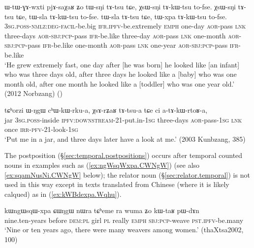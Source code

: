 \begin{exe}
\ex \label{ex:tWsNi.tAtsu}
\gll ɯ-tɯ-ɣɤ-wxti pjɤ-saχaʁ ʑo tɯ-sŋi tɤ-tsu tɕe, χsɯ-sŋi tɤ-kɯ-tsu to-fse. χsɯ-sŋi tɤ-tsu tɕe, tɯ-sla tɤ-kɯ-tsu to-fse. tɯ-sla tɤ-tsu tɕe, tɯ-xpa tɤ-kɯ-tsu to-fse. \\
\textsc{3sg}.\textsc{poss}-\textsc{nmlz}:\textsc{deg}-\textsc{facil}-be.big \textsc{ifr}.\textsc{ipfv}-be.extremely \textsc{emph} one-day \textsc{aor}-pass \textsc{lnk} three-days \textsc{aor}-\textsc{sbj}:\textsc{pcp}-pass \textsc{ifr}-be.like three-day \textsc{aor}-pass \textsc{lnk} one-month \textsc{aor}-\textsc{sbj}:\textsc{pcp}-pass \textsc{ifr}-be.like one-month \textsc{aor}-pass \textsc{lnk} one-year \textsc{aor}-\textsc{sbj}:\textsc{pcp}-pass \textsc{ifr}-be.like  \\
\glt `He grew extremely fast, one day after [he was born] he looked like [an infant] who was three days old, after three days he looked like a [baby] who was one month old, after one month he looked like a [toddler] who was one year old.' (2012 Norbzang)
()
\end{exe}


\begin{exe}
\ex \label{ex:tAtsua}
\gll  tɕʰorzi ɯ-ŋgɯ cʰɯ-kɯ-rku-a, χsɤ-rʑaʁ tɤ-tsu-a tɕe ci a-tɤ-kɯ-rtoʁ-a, \\
jar \textsc{3sg}.\textsc{poss}-inside \textsc{ipfv}:\textsc{downstream}-2\fl{}1-put.in-\textsc{1sg} three-days \textsc{aor}-pass-\textsc{1sg} \textsc{lnk} once \textsc{irr}-\textsc{pfv}-2\fl{}1-look-\textsc{1sg} \\
\glt `Put me in a jar, and three days later have a look at me.' (2003 Kunbzang, 385)
\end{exe} 

The postposition  (§\ref{sec:temporal.postpositions}) occurs after temporal counted nouns in examples such as (\ref{ex:ngWsqWxpa.CWNgW}) (see also \ref{ex:sqamNusNi.CWNgW}  below); the relator noun  (§\ref{sec:relator.temporal}) is not used in this way except in texts translated from Chinese (where it is likely calqued) as in (\ref{ex:kWBdexpa.Wqhu}).

\begin{exe}
\ex \label{ex:ngWsqWxpa.CWNgW}
 \gll kɯngɯsqɯ-xpa ɕɯŋgɯ nɯra tɕʰeme ra wuma ʑo kɯ-taʁ pɯ-dɤn \\
nine.ten-years before \textsc{dem}:\textsc{pl} girl \textsc{pl} really \textsc{emph} \textsc{sbj}:\textsc{pcp}-weave \textsc{pst}.\textsc{ipfv}-be.many \\
 \glt `Nine or ten years ago, there were many weavers among women.' (thaXtsa2002, 100)
\end{exe}

